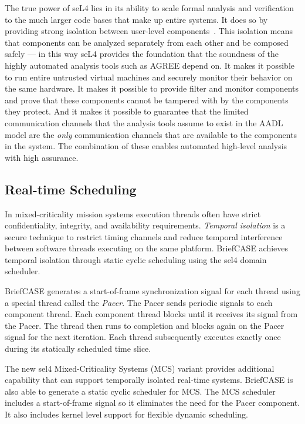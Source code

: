 The true power of seL4 lies in its ability to scale formal analysis and verification to the much larger code bases that make up entire systems.
It does so by providing strong isolation between user-level components~\cite{sel4-cacm18}.
This isolation means that components can be analyzed separately from each other and be composed safely --- in this way seL4 provides the foundation that the soundness of the highly automated analysis tools such as AGREE depend on.
It makes it possible to run entire untrusted virtual machines and securely monitor their behavior on the
same hardware.
It makes it possible to provide filter and monitor components and prove that these components cannot be tampered with by the components they protect.
And it makes it possible to guarantee that the limited communication channels that the analysis tools assume to exist in the AADL model are the \emph{only} communication channels that are available to the
components in the system.
The combination of these enables automated high-level analysis with high assurance.

\subsection{Real-time Scheduling}

In mixed-criticality mission systems execution threads often have strict confidentiality, integrity, and availability requirements. 
\emph{Temporal isolation} is a secure technique to restrict timing channels and reduce temporal interference between software threads executing on the same platform. 
BriefCASE achieves temporal isolation through static cyclic scheduling using the sel4 domain scheduler.

BriefCASE generates a start-of-frame synchronization signal for each thread using a special thread called the \emph{Pacer}.
The Pacer sends periodic signals to each component thread.
Each component thread blocks until it receives its signal from the Pacer.
The thread then runs to completion and blocks again on the Pacer signal for the next iteration. 
Each thread subsequently executes exactly once during its statically scheduled time slice.

The new sel4 Mixed-Criticality Systems (MCS) variant provides additional capability that can support temporally isolated real-time systems. 
BriefCASE is also able to generate a static cyclic scheduler for MCS.
The MCS scheduler includes a start-of-frame signal so it eliminates the need for the Pacer component.
It also includes kernel level support for flexible dynamic scheduling.

